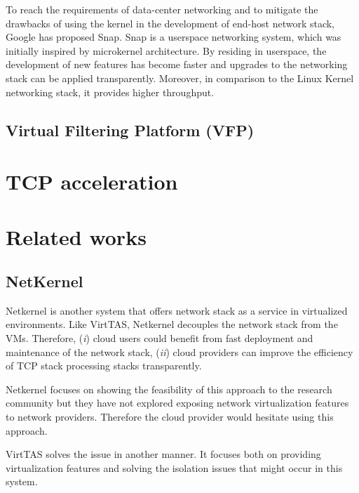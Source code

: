 To reach the requirements of data-center networking and to mitigate the drawbacks of using the kernel in the development of end-host network stack, Google has proposed Snap. Snap is a userspace networking system, which was initially inspired by microkernel architecture. By residing in userspace, the development of new features has become faster and upgrades to the networking stack can be applied transparently. Moreover, in comparison to the Linux Kernel networking stack, it provides higher throughput.

\subsection{Virtual Filtering Platform (VFP)}
\label{vfp}




\section{TCP acceleration}


\section{Related works}
\subsection{NetKernel}
Netkernel is another system that offers network stack as a service in virtualized environments.
Like VirtTAS, Netkernel decouples the network stack from the VMs. Therefore, (\emph{i}) cloud users could benefit from fast deployment and maintenance of the network stack, (\emph{ii}) cloud providers can improve the efficiency of TCP stack processing stacks transparently. 

Netkernel focuses on showing the feasibility of this approach to the research community but they have not explored exposing network virtualization features to network providers. Therefore the cloud provider would hesitate using this approach. %

VirtTAS solves the issue in another manner. It focuses both on providing virtualization features and solving the isolation issues that might occur in this system. %